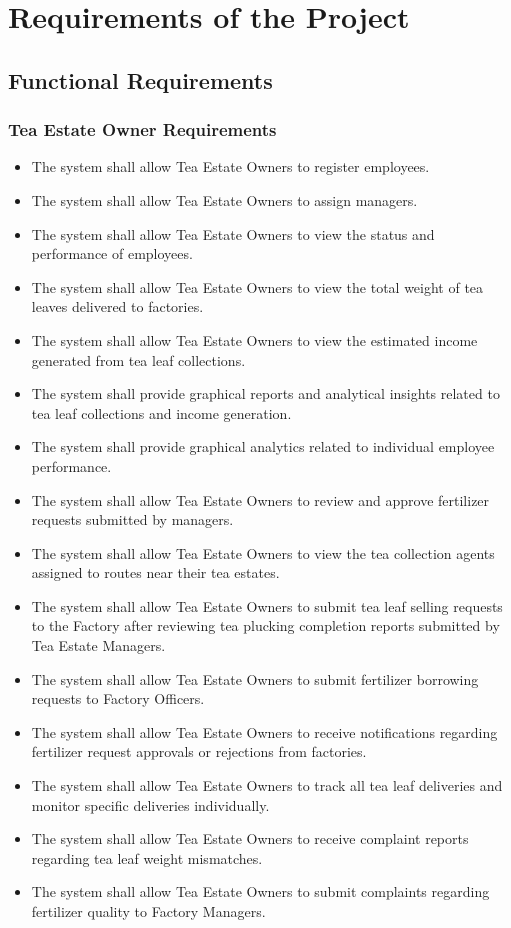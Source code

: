 \section{Requirements of the Project}
\label{sec:requirements}

\subsection{Functional Requirements}


\subsubsection{Tea Estate Owner Requirements}
\begin{itemize}
\item The system shall allow Tea Estate Owners to register employees.
    \item The system shall allow Tea Estate Owners to assign managers.
    \item The system shall allow Tea Estate Owners to view the status and performance of employees.
    \item The system shall allow Tea Estate Owners to view the total weight of tea leaves delivered to factories.
    \item The system shall allow Tea Estate Owners to view the estimated income generated from tea leaf collections.
    \item The system shall provide graphical reports and analytical insights related to tea leaf collections and income generation.
    \item The system shall provide graphical analytics related to individual employee performance.
    \item The system shall allow Tea Estate Owners to review and approve fertilizer requests submitted by managers.
    \item The system shall allow Tea Estate Owners to view the tea collection agents assigned to routes near their tea estates.
    \item The system shall allow Tea Estate Owners to submit tea leaf selling requests to the Factory after reviewing tea plucking completion reports submitted by Tea Estate Managers.
    \item The system shall allow Tea Estate Owners to submit fertilizer borrowing requests to Factory Officers.
    \item The system shall allow Tea Estate Owners to receive notifications regarding fertilizer request approvals or rejections from factories.
    \item The system shall allow Tea Estate Owners to track all tea leaf deliveries and monitor specific deliveries individually.
    \item The system shall allow Tea Estate Owners to receive complaint reports regarding tea leaf weight mismatches.
    \item The system shall allow Tea Estate Owners to submit complaints regarding fertilizer quality to Factory Managers.
\end{itemize}

